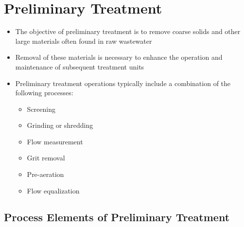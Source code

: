 \newpage
\section{Preliminary Treatment}

			\begin{itemize}
				\item The objective of preliminary treatment is to remove coarse solids and other large materials often found in raw wastewater
				\item Removal of these materials is necessary to enhance the operation and maintenance of subsequent treatment units\\
				\item Preliminary treatment operations typically include a combination of the following processes:
					\begin{itemize}
						\item Screening
						\item Grinding or shredding
						\item Flow measurement
						\item Grit removal
						\item Pre-aeration
						\item Flow equalization
					\end{itemize}
			\end{itemize}

				
		\subsection{Process Elements of Preliminary Treatment}	
			
